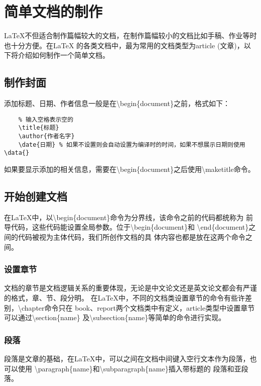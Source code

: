 \section{简单文档的制作}
LaTeX不但适合制作篇幅较大的文档，在制作篇幅较小的文档比如手稿、作业等时也十分方便。在LaTeX
的各类文档中，最为常用的文档类型为article (文章)，以下将介绍如何制作一个简单文档。

\subsection{制作封面}
添加标题、日期、作者信息一般是在\textbackslash begin\{document\}之前，格式如下：
\begin{lstlisting}
    % 输入空格表示空的
    \title{标题}
    \author{作者名字}
    \date{日期} % 如果不设置则会自动设置为编译时的时间，如果不想展示日期则使用\data{}
\end{lstlisting}

如果要显示添加的相关信息，需要在\textbackslash begin\{document\}之后使用\textbackslash maketitle命令。

\subsection{开始创建文档}
在LaTeX中，以\textbackslash begin\{document\}命令为分界线，该命令之前的代码都统称为
前导代码，这些代码能设置全局参数。位于\textbackslash begin\{document\}和
\textbackslash end\{document\}之间的代码被视为主体代码，我们所创作文档的具
体内容也都是放在这两个命令之间。

\subsubsection{设置章节}
文档的章节是文档逻辑关系的重要体现，无论是中文论文还是英文论文都会有严谨的格式，章、节、段分明。
在LaTeX中，不同的文档类设置章节的命令有些许差别，\textbackslash chapter命令只在
book、report两个文档类中有定义，article类型中设置章节可以通过\textbackslash section\{name\}
及\textbackslash subsection\{name\}等简单的命令进行实现。

\subsubsection{段落}
段落是文章的基础，在LaTeX中，可以之间在文档中间键入空行文本作为段落，也可以使用
\textbackslash paragraph\{name\}和\textbackslash subparagraph\{name\}插入带标题的
段落和亚段落。

